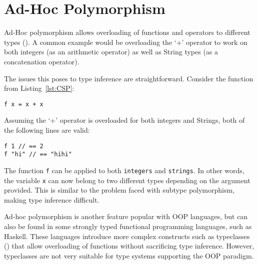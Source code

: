 \section{Ad-Hoc Polymorphism}

Ad-Hoc polymorphism allows overloading of functions and operators to different types (\cite{pierce}). A common example would be overloading the `+' operator to work on both integers (as an arithmetic operator) as well as String types (as a concatenation operator).

The issues this poses to type inference are straightforward. Consider the function from Listing~\ref{lst:CSP}:
\begin{lstlisting}
f x = x + x
\end{lstlisting}
Assuming the `+' operator is overloaded for both integers and Strings, both of the following lines are valid:
\begin{lstlisting}
f 1 // == 2
f "hi" // == "hihi"
\end{lstlisting}
The function \texttt{f} can be applied to both \texttt{integers} and \texttt{strings}. In other words, the variable \texttt{x} can now belong to two different types depending on the argument provided. This is similar to the problem faced with subtype polymorphism, making type inference difficult.

Ad-hoc polymorphism is another feature popular with OOP languages, but can also be found in some strongly typed functional programming languages, such as Haskell. These languages introduce more complex constructs such as typeclasses (\cite{osullivan}) that allow overloading of functions without sacrificing type inference. However, typeclasses are not very suitable for type systems supporting the OOP paradigm.
